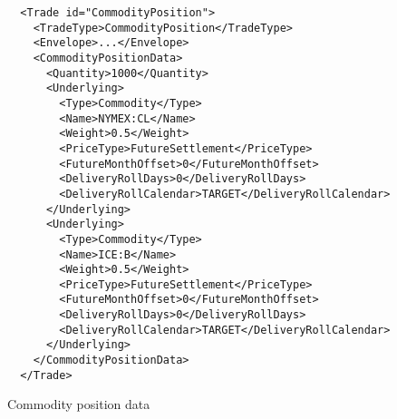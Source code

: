 \begin{listing}[H]
\begin{verbatim}
  <Trade id="CommodityPosition">
    <TradeType>CommodityPosition</TradeType>
    <Envelope>...</Envelope>
    <CommodityPositionData>
      <Quantity>1000</Quantity>
      <Underlying>
        <Type>Commodity</Type>
        <Name>NYMEX:CL</Name>
        <Weight>0.5</Weight>
        <PriceType>FutureSettlement</PriceType>
        <FutureMonthOffset>0</FutureMonthOffset>
        <DeliveryRollDays>0</DeliveryRollDays>
        <DeliveryRollCalendar>TARGET</DeliveryRollCalendar>
      </Underlying>
      <Underlying>
        <Type>Commodity</Type>
        <Name>ICE:B</Name>
        <Weight>0.5</Weight>
        <PriceType>FutureSettlement</PriceType>
        <FutureMonthOffset>0</FutureMonthOffset>
        <DeliveryRollDays>0</DeliveryRollDays>
        <DeliveryRollCalendar>TARGET</DeliveryRollCalendar>
      </Underlying>
    </CommodityPositionData>
  </Trade>
\end{verbatim}
\caption{Commodity position data}
\label{lst:commoditypositiondata}
\end{listing}

